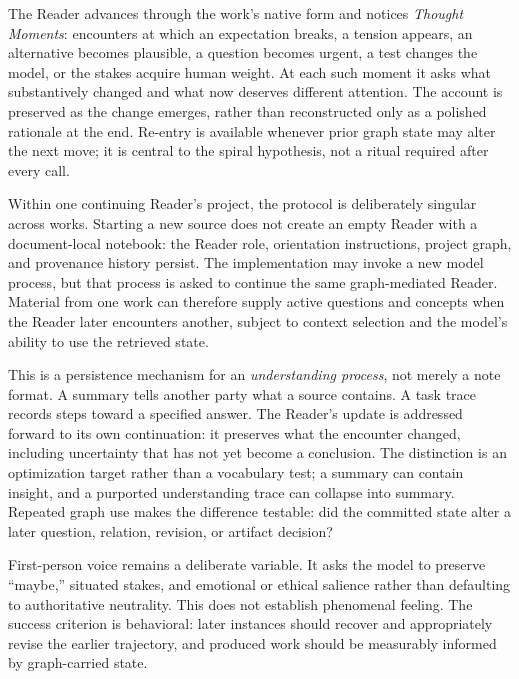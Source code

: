 The Reader advances through the work's native form and notices \emph{Thought Moments}: encounters at which an expectation breaks, a tension appears, an alternative becomes plausible, a question becomes urgent, a test changes the model, or the stakes acquire human weight. At each such moment it asks what substantively changed and what now deserves different attention. The account is preserved as the change emerges, rather than reconstructed only as a polished rationale at the end. Re-entry is available whenever prior graph state may alter the next move; it is central to the spiral hypothesis, not a ritual required after every call.

Within one continuing Reader's project, the protocol is deliberately singular across works. Starting a new source does not create an empty Reader with a document-local notebook: the Reader role, orientation instructions, project graph, and provenance history persist. The implementation may invoke a new model process, but that process is asked to continue the same graph-mediated Reader. Material from one work can therefore supply active questions and concepts when the Reader later encounters another, subject to context selection and the model's ability to use the retrieved state.

This is a persistence mechanism for an \emph{understanding process}, not merely a note format. A summary tells another party what a source contains. A task trace records steps toward a specified answer. The Reader's update is addressed forward to its own continuation: it preserves what the encounter changed, including uncertainty that has not yet become a conclusion. The distinction is an optimization target rather than a vocabulary test; a summary can contain insight, and a purported understanding trace can collapse into summary. Repeated graph use makes the difference testable: did the committed state alter a later question, relation, revision, or artifact decision?

First-person voice remains a deliberate variable. It asks the model to preserve ``maybe,'' situated stakes, and emotional or ethical salience rather than defaulting to authoritative neutrality. This does not establish phenomenal feeling. The success criterion is behavioral: later instances should recover and appropriately revise the earlier trajectory, and produced work should be measurably informed by graph-carried state.

